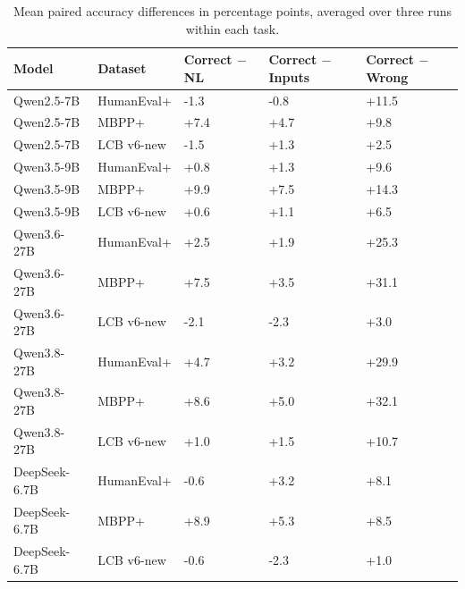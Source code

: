 \begin{table}[!htbp]
\centering
\caption{Mean paired accuracy differences in percentage points, averaged over three runs within each task.}
\label{tab:main-effects}
\small
\begin{tabular}{lllll}
\toprule
Model & Dataset & Correct $-$ NL & Correct $-$ Inputs & Correct $-$ Wrong \\
\midrule
Qwen2.5-7B & HumanEval+ & -1.3 & -0.8 & +11.5 \\
Qwen2.5-7B & MBPP+ & +7.4 & +4.7 & +9.8 \\
Qwen2.5-7B & LCB v6-new & -1.5 & +1.3 & +2.5 \\
Qwen3.5-9B & HumanEval+ & +0.8 & +1.3 & +9.6 \\
Qwen3.5-9B & MBPP+ & +9.9 & +7.5 & +14.3 \\
Qwen3.5-9B & LCB v6-new & +0.6 & +1.1 & +6.5 \\
Qwen3.6-27B & HumanEval+ & +2.5 & +1.9 & +25.3 \\
Qwen3.6-27B & MBPP+ & +7.5 & +3.5 & +31.1 \\
Qwen3.6-27B & LCB v6-new & -2.1 & -2.3 & +3.0 \\
Qwen3.8-27B & HumanEval+ & +4.7 & +3.2 & +29.9 \\
Qwen3.8-27B & MBPP+ & +8.6 & +5.0 & +32.1 \\
Qwen3.8-27B & LCB v6-new & +1.0 & +1.5 & +10.7 \\
DeepSeek-6.7B & HumanEval+ & -0.6 & +3.2 & +8.1 \\
DeepSeek-6.7B & MBPP+ & +8.9 & +5.3 & +8.5 \\
DeepSeek-6.7B & LCB v6-new & -0.6 & -2.3 & +1.0 \\
\bottomrule
\end{tabular}
\end{table}
